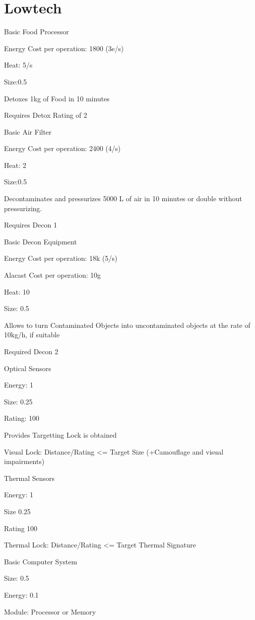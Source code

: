 \section{Lowtech}\label{sec:lowtech}
Basic Food Processor\par
Energy Cost per operation: 1800 (3e/s)\par
Heat: 5/s \par
Size:0.5\par
Detoxes 1kg of Food in 10 minutes \par
Requires Detox Rating of 2\par
\par
Basic Air Filter\par
Energy Cost per operation: 2400 (4/s)\par
Heat: 2\par
Size:0.5\par
Decontaminates and pressurizes 5000 L of air in  10 minutes or double without pressurizing. \par
Requires Decon 1\par
\par
Basic Decon Equipment \par
Energy Cost per operation: 18k (5/s)\par
Alacast Cost per operation: 10g\par
Heat: 10 \par
Size: 0.5\par
Allows to turn Contaminated Objects into uncontaminated objects at the rate of 10kg/h, if suitable\par
Required Decon 2\par
\par
Optical Sensors\par
Energy: 1\par
Size: 0.25 \par
Rating: 100\par
Provides Targetting Lock is obtained\par
Visual Lock: Distance/Rating <= Target Size (+Camouflage and visual impairments)\par
\par
Thermal Sensors\par
Energy: 1\par
Size 0.25\par
Rating 100\par
Thermal Lock: Distance/Rating <= Target Thermal Signature\par
\par
Basic Computer System\par
Size: 0.5\par
Energy: 0.1\par
Module: Processor or Memory\par
\par
